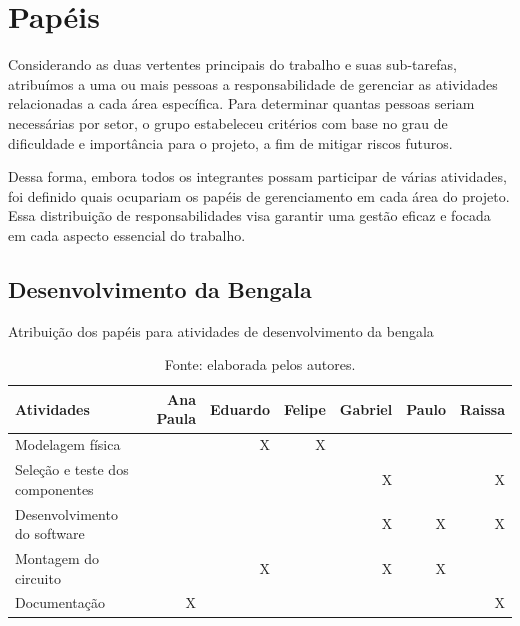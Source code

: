     \section{Papéis}
    
    Considerando as duas vertentes principais do trabalho e suas sub-tarefas, atribuímos a uma ou mais pessoas a responsabilidade de gerenciar as atividades relacionadas a cada área específica. Para determinar quantas pessoas seriam necessárias por setor, o grupo estabeleceu critérios com base no grau de dificuldade e importância para o projeto, a fim de mitigar riscos futuros.
    
    Dessa forma, embora todos os integrantes possam participar de várias atividades, foi definido quais ocupariam os papéis de gerenciamento em cada área do projeto. Essa distribuição de responsabilidades visa garantir uma gestão eficaz e focada em cada aspecto essencial do trabalho.

    \subsection{Desenvolvimento da Bengala}
    
        \begin{table}[!ht]    
            \captionsetup{width=1.0\textwidth} %
            \caption{Atribuição dos papéis para atividades de desenvolvimento da bengala}    
            \begin{tabular}{lrrrrrr}
                \toprule
                Atividades & Ana Paula & Eduardo & Felipe & Gabriel & Paulo & Raissa \\
                \midrule
                Modelagem física                        &   & X & X &   &   &   \\
                Seleção e teste dos componentes         &   &   &   & X &   & X \\
                Desenvolvimento do software             &   &   &   & X & X & X \\
                Montagem do circuito                    &   & X &   & X & X &   \\
                Documentação                            & X &   &   &   &   & X \\
                \bottomrule
            \end{tabular}
            \caption*{Fonte: elaborada pelos autores.} %
        \end{table}


